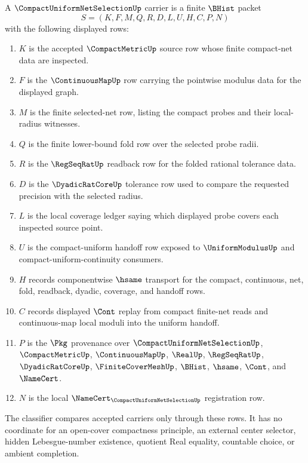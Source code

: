 \begin{definition}
\label{def:compact-uniform-net-selection-carrier}
A $\CompactUniformNetSelectionUp$ carrier is a finite $\BHist$ packet
$$
S=(K,F,M,Q,R,D,L,U,H,C,P,N)
$$
with the following displayed rows:
\begin{enumerate}
\item $K$ is the accepted $\CompactMetricUp$ source row whose finite compact-net data are inspected.
\item $F$ is the $\ContinuousMapUp$ row carrying the pointwise modulus data for the displayed graph.
\item $M$ is the finite selected-net row, listing the compact probes and their local-radius witnesses.
\item $Q$ is the finite lower-bound fold row over the selected probe radii.
\item $R$ is the $\RegSeqRatUp$ readback row for the folded rational tolerance data.
\item $D$ is the $\DyadicRatCoreUp$ tolerance row used to compare the requested precision with the selected radius.
\item $L$ is the local coverage ledger saying which displayed probe covers each inspected source point.
\item $U$ is the compact-uniform handoff row exposed to $\UniformModulusUp$ and compact-uniform-continuity consumers.
\item $H$ records componentwise $\hsame$ transport for the compact, continuous, net, fold, readback, dyadic, coverage, and handoff rows.
\item $C$ records displayed $\Cont$ replay from compact finite-net reads and continuous-map local moduli into the uniform handoff.
\item $P$ is the $\Pkg$ provenance over $\CompactUniformNetSelectionUp$, $\CompactMetricUp$, $\ContinuousMapUp$, $\RealUp$, $\RegSeqRatUp$, $\DyadicRatCoreUp$, $\FiniteCoverMeshUp$, $\BHist$, $\hsame$, $\Cont$, and $\NameCert$.
\item $N$ is the local $\NameCert_{\CompactUniformNetSelectionUp}$ registration row.
\end{enumerate}
The classifier compares accepted carriers only through these rows. It has no coordinate for an open-cover compactness principle, an external center selector, hidden Lebesgue-number existence, quotient Real equality, countable choice, or ambient completion.
\end{definition}

